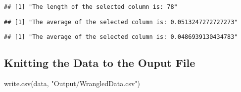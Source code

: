 \documentclass[
]{article}
\newenvironment{Shaded}{\begin{snugshade}}{\end{snugshade}}
\newcommand{\FunctionTok}[1]{\textcolor[rgb]{0.00,0.00,0.00}{#1}}
\newcommand{\NormalTok}[1]{#1}
\newcommand{\SpecialCharTok}[1]{\textcolor[rgb]{0.00,0.00,0.00}{#1}}
\newcommand{\StringTok}[1]{\textcolor[rgb]{0.31,0.60,0.02}{#1}}
\begin{document}
\begin{verbatim}
## [1] "The length of the selected column is: 78"
\end{verbatim}

\begin{Shaded}
\end{Shaded}

\begin{verbatim}
## [1] "The average of the selected column is: 0.0513247272727273"
\end{verbatim}

\begin{verbatim}
## [1] "The average of the selected column is: 0.0486939130434783"
\end{verbatim}

\hypertarget{knitting-the-data-to-the-ouput-file}{%
\subsection{Knitting the Data to the Ouput
File}\label{knitting-the-data-to-the-ouput-file}}

\begin{Shaded}
\begin{Highlighting}[]
\FunctionTok{write.csv}\NormalTok{(data, }\StringTok{"Output/WrangledData.csv"}\NormalTok{)}
\end{Highlighting}
\end{Shaded}
\end{document}

